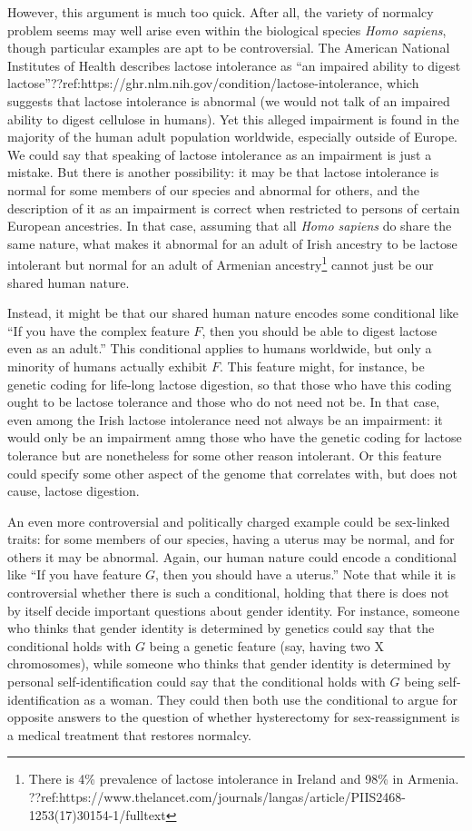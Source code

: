 However, this argument is much too quick. After all, the variety of normalcy problem seems may well arise even within the 
biological species \textit{Homo sapiens}, though particular examples are apt to be controversial. The American National
Institutes of Health describes lactose intolerance as ``an impaired ability to digest lactose''??ref:https://ghr.nlm.nih.gov/condition/lactose-intolerance,
which suggests that lactose intolerance is abnormal (we would not talk of an impaired ability to digest cellulose in humans).
Yet this alleged impairment is found in the majority of the human adult population worldwide, especially outside of Europe.
We could say that speaking of lactose intolerance as an impairment is just a mistake. But there is another possibility: it may
be that lactose intolerance is normal for some members of our species and abnormal for others, and the description of it as
an impairment is correct when restricted to persons of certain European ancestries.
In that case, assuming that all \textit{Homo sapiens} do share the same nature, what makes it abnormal for an adult
of Irish ancestry to be lactose intolerant but normal for an adult of Armenian ancestry\footnote{There is 4\% prevalence of
lactose intolerance in Ireland and 98\% in Armenia. ??ref:https://www.thelancet.com/journals/langas/article/PIIS2468-1253(17)30154-1/fulltext }
cannot just be our shared human nature. 

Instead, it might be that our shared human nature encodes some conditional like ``If you have the complex feature $F$, then you
should be able to digest lactose even as an adult.'' This conditional applies to humans worldwide, but only a minority of humans
actually exhibit $F$. This feature might, for instance, be genetic coding for life-long lactose digestion, so that those
who have this coding ought to be lactose tolerance and those who do not need not be. In that case, even among the Irish lactose intolerance
need not always be an impairment: it would only be an impairment amng those who have the genetic coding for lactose tolerance but are
nonetheless for some other reason intolerant. Or this feature could specify some other aspect of the genome that correlates with, but
does not cause, lactose digestion.

An even more controversial and politically charged example could be sex-linked traits: for some members of our species, having a uterus may be normal, and for others
it may be abnormal. Again, our human nature could encode a conditional like ``If you have feature $G$, then you should have a uterus.''
Note that while it is controversial whether there is such a conditional, holding that there is does not by itself decide important questions about gender identity.
For instance, someone who thinks that gender identity is determined by genetics could say that the conditional holds with $G$ being a genetic
feature (say, having two X chromosomes), while someone who thinks that gender identity is determined by personal self-identification could say
that the conditional holds with $G$ being self-identification as a woman. They could then both use the conditional to argue for opposite answers
to the question of whether hysterectomy for sex-reassignment is a medical treatment that restores normalcy.

